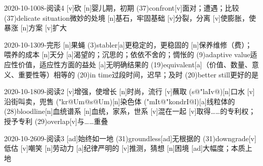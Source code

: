 \documentclass[12pt]{ctexart}
\begin{document}
\begin{wordlist}{2020-10-10}{08-阅读4}
  [v]{砍}
  [n]{婴儿期，初期}
  \word(37){confront}[v]{面对；遭遇；比较}
  \word[2020-10-25](37){delicate situation}{微妙的处境}
  [n]{基石，牢固基础}
  [v]{分裂，分离}
  [v]{使膨胀，使暴涨}
  [n]{方案}
  [v]{扩大}
\end{wordlist}
\begin{wordlist}{2020-10-13}{09-完形}
  [n]{果蝇}
  \word[2020-10-20](3){stabler}[a]{更稳定的，更稳固的}
  [n]{保养维修（费）；喂养的成本}
  [n]{天分}
  [a]{渴望的；沉思的；依依不舍的；惆怅的}
  \word(9){adaptive value}{适应性价值，适应性方面的益处}
  [a]{无明确结果的}
  \word(19){equivalent}[a]{（价值、数量、意义、重要性等）相等的}
  \word(20){in time}{过段时间，迟早；及时}
  \word(20){better still}{更好的是}
\end{wordlist}
\begin{wordlist}{2020-10-18}{09-阅读2}
  [v]{增强，使增长}
  [n]{时尚，流行}
  [v]{蘸取}
  (s@"laIv@)[n]{口水}
  [v]{沿街叫卖，兜售}
  ("kr@Um@s@Um)[n]{染色体}
  ("mIt@"kondrI@l)[a]{线粒体的}
  \word(28){bloodline}[n]{血统谱系}
  [n]{血统，家系，世系}
  [v]{混在一起}
  [v]{取得……的专利权；授予专利}
  \word[2020-10-20](29){overlap}[v]{与……重叠}
\end{wordlist}
\begin{wordlist}{2020-10-26}{09-阅读3}
  [ad]{始终如一地}
  \word(31){groundless}[ad]{无根据的}
  \word[2020-10-28](31){downgrade}[v]{低估}
  [v]{嘲笑}
  [n]{劳动力}
  [a]{纪律严明的}
  [v]{推测，猜想}
  [n]{困境}
  [ad]{大幅度；本质上地}
\end{wordlist}
\end{document}
